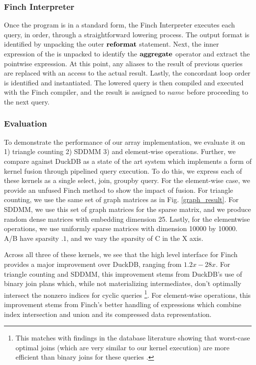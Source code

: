 \subsubsection{Finch Interpreter} 
Once the program is in a standard form, the Finch Interpreter executes each query, in order, through a straightforward lowering process. The output format is identified by unpacking the outer $\text{\textbf{reformat}}$ statement. Next, the inner expression of the is unpacked to identify the $\text{\textbf{aggregate}}$ operator and extract the pointwise expression. At this point, any aliases to the result of previous queries are replaced with an access to the actual result. Lastly, the concordant loop order is identified and instantiated. The lowered query is then compiled and executed with the Finch compiler, and the result is assigned to $name$ before proceeding to the next query. 


\subsubsection{Evaluation}
To demonstrate the performance of our array implementation, we evaluate it on 1) triangle counting 2) SDDMM 3) and element-wise operations. Further, we compare against DuckDB as a state of the art system which implements a form of kernel fusion through pipelined query execution. To do this, we express each of these kernels as a single select, join, groupby query. For the element-wise case, we provide an unfused Finch method to show the impact of fusion. For triangle counting, we use the same set of graph matrices as in Fig. \ref{graph_result}. For SDDMM, we use this set of graph matrices for the sparse matrix, and we produce random dense matrices with embedding dimension 25. Lastly, for the elementwise operations, we use uniformly sparse matrices with dimension 10000 by 10000. A/B have sparsity $.1$, and we vary the sparsity of C in the X axis.

Across all three of these kernels, we see that the high level interface for Finch provides a major improvement over DuckDB, ranging from $1.2x-28x$. For triangle counting and SDDMM, this improvement stems from DuckDB's use of binary join plans which, while not materializing intermediates, don't optimally intersect the nonzero indices for cyclic queries \footnote{This matches with findings in the database literature showing that worst-case optimal joins (which are very similar to our kernel execution) are more efficient than binary joins for these queries \cite{wang2023free}.}. For element-wise operations, this improvement stems from Finch's better handling of expressions which combine index intersection and union and its compressed data representation.

